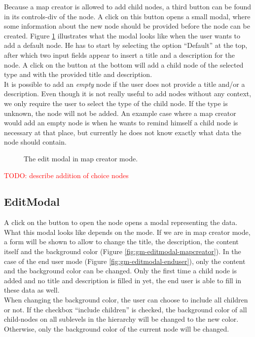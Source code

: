 Because a map creator is allowed to add child nodes, a third button can be found in its controls-div of the node. A click on this button opens a small modal, where some information about the new node should be provided before the node can be created. Figure \ref{fig:gm-add-default} illustrates what the modal looks like when the user wants to add a default node. He has to start by selecting the option ``Default'' at the top, after which two input fields appear to insert a title and a description for the node. A click on the button at the bottom will add a child node of the selected type and with the provided title and description.\\

It is possible to add an \textit{empty} node if the user does not provide a title and/or a description. Even though it is not really useful to add nodes without any context, we only require the user to select the type of the child node. If the type is unknown, the node will not be added. An example case where a map creator would add an empty node is when he wants to remind himself a child node is necessary at that place, but currently he does not know exactly what data the node should contain.

\begin{figure}[H]
	\centering
	\caption{The edit modal in map creator mode.}
	\label{fig:gm-add-default}
\end{figure}

\textcolor{red}{TODO: describe addition of choice nodes}



\subsection{EditModal}\label{sec:editmodal}
A click on the button to open the node opens a modal representing the data. What this modal looks like depends on the mode. If we are in map creator mode, a form will be shown to allow to change the title, the description, the content itself and the background color (Figure \ref{fig:gm-editmodal-mapcreator}). In the case of the end user mode (Figure \ref{fig:gm-editmodal-enduser}), only the content and the background color can be changed. Only the first time a child node is added and no title and description is filled in yet, the end user is able to fill in these data as well.\\

When changing the background color, the user can choose to include all children or not. If the checkbox ``include children'' is checked, the background color of all child-nodes on all sublevels in the hierarchy will be changed to the new color. Otherwise, only the background color of the current node will be changed.\\

